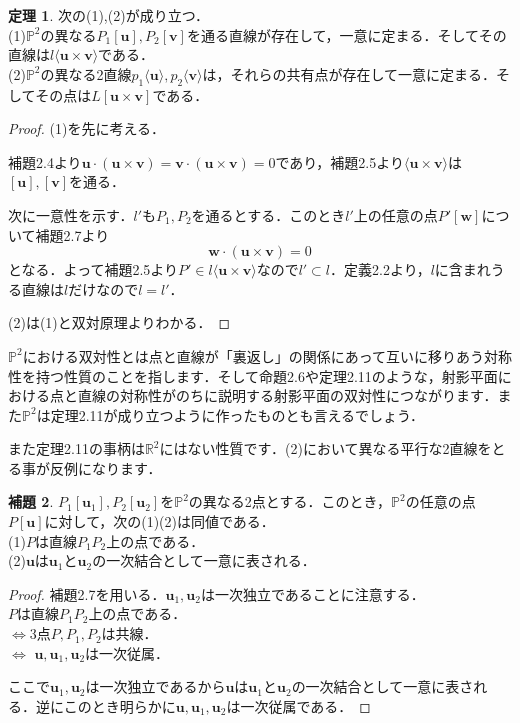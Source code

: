 \documentclass{jsarticle}
\theoremstyle{definition}
\newtheorem{theorem}{定理}
\newtheorem{lemma}[theorem]{補題}
\numberwithin{theorem}{section}
\numberwithin{equation}{section}
\begin{document}
\begin{theorem}次の(1),(2)が成り立つ．
\\(1)$\mathbb{P}^2$の異なる$P_1[\bm{u}],P_2[\bm{v}]$を通る直線が存在して，一意に定まる．そしてその直線は$l\langle\bm{u}\times\bm{v}\rangle$である．
\\(2)$\mathbb{P}^2$の異なる2直線$p_1\langle\bm{u}\rangle,p_2\langle\bm{v}\rangle$は，それらの共有点が存在して一意に定まる．そしてその点は$L[\bm{u}\times\bm{v}]$である．
\end{theorem}
\begin{proof}
(1)を先に考える．
\par 補題2.4より$\bm{u}\cdot(\bm{u}\times\bm{v})=\bm{v}\cdot(\bm{u}\times\bm{v})=0$であり，補題2.5より$\langle\bm{u}\times\bm{v}\rangle$は$[\bm{u}],[\bm{v}]$を通る．
\par 次に一意性を示す．$l'$も$P_1,P_2$を通るとする．このとき$l'$上の任意の点$P'[\bm{w}]$について補題2.7より
$$\bm{w}\cdot(\bm{u}\times\bm{v})=0$$
となる．よって補題2.5より$P'\in l\langle\bm{u}\times\bm{v}\rangle$なので$l'\subset l$．定義2.2より，$l$に含まれうる直線は$l$だけなので$l=l'$．
\par (2)は(1)と双対原理よりわかる．
\end{proof}
$\mathbb{P}^2$における双対性とは点と直線が「裏返し」の関係にあって互いに移りあう対称性を持つ性質のことを指します．そして命題2.6や定理2.11のような，射影平面における点と直線の対称性がのちに説明する射影平面の双対性につながります．また$\mathbb{P}^2$は定理2.11が成り立つように作ったものとも言えるでしょう．
\par また定理2.11の事柄は$\mathbb{R}^2$にはない性質です．(2)において異なる平行な2直線をとる事が反例になります．
\begin{lemma}
$P_1 [\bm{u}_1],P_2 [\bm{u}_2]$を$\mathbb{P}^2$の異なる2点とする．このとき，$\mathbb{P}^2$の任意の点$P [\bm{u}]$に対して，次の(1)(2)は同値である．
\\(1)$P$は直線$P_1 P_2$上の点である．
\\(2)$\bm{u}$は$\bm{u}_1$と$\bm{u}_2$の一次結合として一意に表される．
\end{lemma}
\begin{proof}
補題2.7を用いる．$\bm{u}_1,\bm{u}_2$は一次独立であることに注意する．
\\$P$は直線$P_1 P_2$上の点である．
\\$\Leftrightarrow$3点$P,P_1 ,P_2$は共線．
\\$\Leftrightarrow$ $\bm{u},\bm{u}_1,\bm{u}_2$は一次従属．
\par ここで$\bm{u}_1,\bm{u}_2$は一次独立であるから$\bm{u}$は$\bm{u}_1$と$\bm{u}_2$の一次結合として一意に表される．逆にこのとき明らかに$\bm{u},\bm{u}_1,\bm{u}_2$は一次従属である．
\end{proof}
\end{document}
